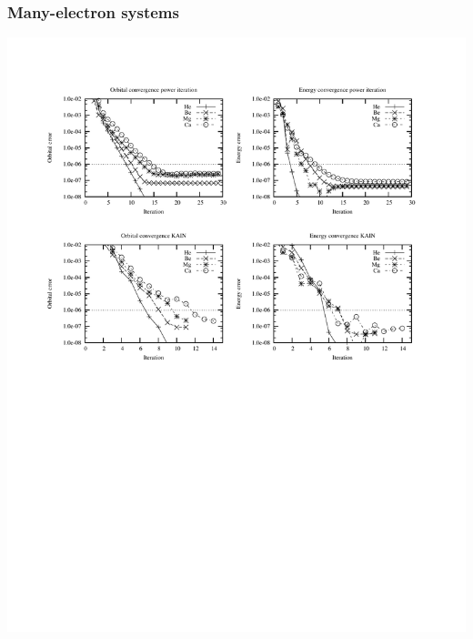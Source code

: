 \documentclass[mathserif]{beamer}
\begin{document}
\begin{frame}
    \frametitle{Many-electron systems}
    \begin{center}
	\includegraphics[scale=0.6, clip, viewport = 50 550 550 740]{figures/accuracy.pdf}
    \end{center}
\end{frame}
\end{document}
